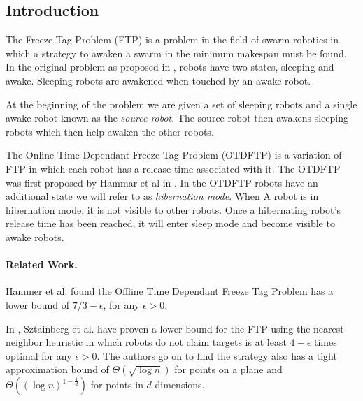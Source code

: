\documentclass[twoside]{article}
\begin{document}
\maketitle 				%
\thispagestyle{fancy} 	%


\begin{multicols}{2} 	%


\section{Introduction}
The Freeze-Tag Problem (FTP) \cite{FTP.0} is a problem in the field of swarm robotics in which a strategy to awaken a swarm in the minimum makespan must be found. In the original problem as proposed in \cite{FTP.0}, robots have two states, sleeping and awake. Sleeping robots are awakened when touched by an awake robot. 

At the beginning of the problem we are given a set of sleeping robots and a single awake robot known as the \textit{source robot}. The source robot then awakens sleeping robots which then help awaken the other robots. 

The Online Time Dependant Freeze-Tag Problem (OTDFTP) is a variation of FTP in which each robot has a release time associated with it. The OTDFTP was first proposed by Hammar et al in \cite{FTP.1}. In the OTDFTP robots have an additional state we will refer to as \textit{hibernation mode}. When A robot is in hibernation mode, it is not visible to other robots. Once a hibernating robot's release time has been reached, it will enter sleep mode and become visible to awake robots. 

\paragraph{Related Work.}
Hammer et al. \cite{FTP.1} found the Offline Time Dependant Freeze Tag Problem has a lower bound of $7/3 - \epsilon$, for any $\epsilon > 0$. 

In \cite{FTP.2}, Sztainberg et al. have proven a lower bound for the FTP using the nearest neighbor heuristic in which robots do not claim targets is at least $4-\epsilon$ times optimal for any $\epsilon > 0$\cite[Theorem ]{FTP.2}. The authors go on to find the strategy also has a tight approximation bound of $\Theta(\sqrt{\log n})$ for points on a plane and $\Theta((\log n)^{1-\frac{1}{d}})$ for points in $d$ dimensions.


\end{multicols}
\end{document}

